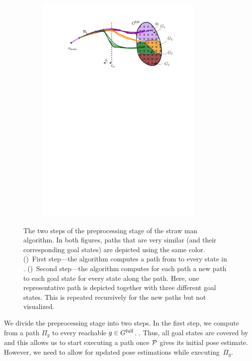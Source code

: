 \documentclass[conference]{IEEEtran}
\begin{document}
\begin{figure}[t]
\begin{subfigure}{0.225\textwidth}
        \includegraphics[width=0.9\textwidth]{naive2}
        \caption{}
        \label{fig:naive2}
    \end{subfigure}
    \caption{
    \CaptionTextSize
    The two steps of the preprocessing stage of the straw man algorithm. In both figures, paths that are very similar (and their corresponding goal states) are depicted using the same color.
    ()~First step---the algorithm computes a path from \Shome to every state in \Gfull.
    ()~Second step---the algorithm computes for each path a new path to each goal state for every state along the path. Here, one representative path is depicted together with three different goal states. 
    This is repeated recursively for the new paths but not visualized.}
    \label{fig:naive}
\end{figure}

We divide the preprocessing stage into two steps.
In the first step, we compute from \Shome a path $\Pi_g$ to every reachable $g \in G^{\textrm{full}}$. 
. Thus, all goal states are covered by \Shome and this allows us to start executing a path once $\mathcal{P}$ gives its initial pose estimate.
However, we need to allow for updated pose estimations while executing~$\Pi_g$. 
\end{document}
